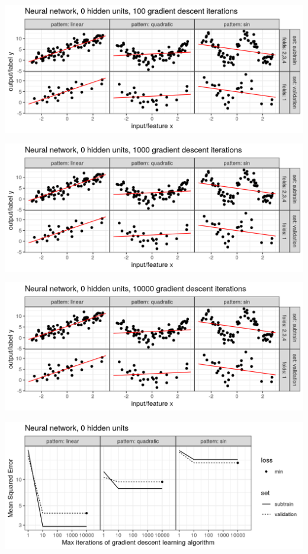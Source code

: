 \begin{frame}
  \includegraphics[width=\textwidth]{figure-overfitting-pred-units=0-maxit=100.png}
\end{frame}


\begin{frame}
  \includegraphics[width=\textwidth]{figure-overfitting-pred-units=0-maxit=1000.png}
\end{frame}


\begin{frame}
  \includegraphics[width=\textwidth]{figure-overfitting-pred-units=0-maxit=10000.png}
\end{frame}


\begin{frame}
  \includegraphics[width=\textwidth]{figure-overfitting-data-loss-0.png}
\end{frame}



